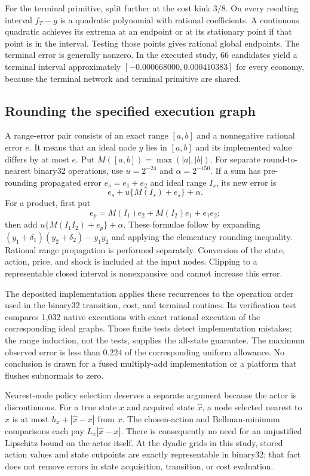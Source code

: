 For the terminal primitive, split further at the cost kink $3/8$.
On every resulting interval $f_T-g$ is a quadratic polynomial with rational
coefficients. A continuous quadratic achieves its extrema at an endpoint
or at its stationary point if that point is in the interval. Testing those
points gives rational global endpoints. The terminal error is generally
nonzero. In the executed study, 66 candidates yield a terminal interval
approximately $[-0.000668000,0.000410383]$ for every economy, because the
terminal network and terminal primitive are shared.

\subsection{Rounding the specified execution graph}
A range-error pair consists of an exact range $[a,b]$ and a nonnegative
rational error $e$. It means that an ideal node $y$ lies in $[a,b]$ and its
implemented value differs by at most $e$. Put $M([a,b])=\max(|a|,|b|)$.
For separate round-to-nearest binary32 operations, use
$u=2^{-24}$ and $\alpha=2^{-150}$. If a sum has pre-rounding propagated
error $e_s=e_1+e_2$ and ideal range $I_s$, its new error is
\[
 e_s+u\{M(I_s)+e_s\}+\alpha.
\]
For a product, first put
\[
 e_p=M(I_1)e_2+M(I_2)e_1+e_1e_2;
\]
then add $u\{M(I_1I_2)+e_p\}+\alpha$. These formulae follow by expanding
$(y_1+\delta_1)(y_2+\delta_2)-y_1y_2$ and applying the elementary rounding
inequality. Rational range propagation is performed separately. Conversion
of the state, action, price, and shock is included at the input nodes.
Clipping to a representable closed interval is nonexpansive and cannot
increase this error.

The deposited implementation applies these recurrences to the operation
order used in the binary32 transition, cost, and terminal routines.
Its verification test compares 1,032 native executions with exact rational
execution of the corresponding ideal graphs. Those finite tests detect
implementation mistakes; the range induction, not the tests, supplies the
all-state guarantee. The maximum observed error is less than $0.224$ of
the corresponding uniform allowance. No conclusion is drawn for a fused
multiply-add implementation or a platform that flushes subnormals to zero.

Nearest-node policy selection deserves a separate argument because the
actor is discontinuous. For a true state $x$ and acquired state
$\widehat x$, a node selected nearest to $\widehat x$ is at most
$h_x+|\widehat x-x|$ from $x$. The chosen-action and Bellman-minimum
comparisons each pay $L_x|\widehat x-x|$. There is consequently no need
for an unjustified Lipschitz bound on the actor itself. At the dyadic grids
in this study, stored action values and state cutpoints are exactly
representable in binary32; that fact does not remove errors in state
acquisition, transition, or cost evaluation.

